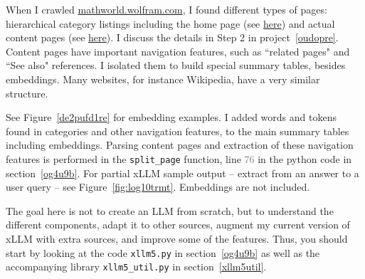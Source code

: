 \documentclass[oneside,10pt]{book}
\begin{document}
When I crawled \href{https://mathworld.wolfram.com/}{mathworld.wolfram.com}, I found different types of pages: hierarchical category listings including the home page
 (see \href{https://github.com/VincentGranville/Large-Language-Models/blob/main/sample-crawled-page-type-1.txt}{here}) and 
actual content pages (see \href{https://github.com/VincentGranville/Large-Language-Models/blob/main/sample-crawled-page-type-3.txt}{here}). 
I discuss the details in Step 2 in project~\ref{oudopre}. Content pages have important navigation features, such as ``related pages" and ``See also" references.  I isolated them to build special summary tables, besides embeddings. 
Many websites, for instance Wikipedia, have a very similar structure. 

See Figure~\ref{de2pufd1re} for embedding examples. I added words and tokens found in categories and
 other navigation features, to the main summary tables including embeddings. Parsing content pages and extraction of these navigation features
 is performed in the \texttt{split\_page} function, line \textcolor{gray}{76} in the python code in section~\ref{og4u9b}. For partial xLLM sample output -- extract from an answer to a user query -- see Figure~\ref{fig:log10trmt}. Embeddings are not included. 

The goal here is not to create an LLM from scratch, but to understand the different components, adapt it to other sources, augment my current version of xLLM with extra sources, and improve some of the features. Thus, you should start by looking at the code 
\texttt{xllm5.py} in section~\ref{og4u9b} as well as the accompanying library \texttt{xllm5\_util.py} in section~\ref{xllm5util}. 
\end{document}

